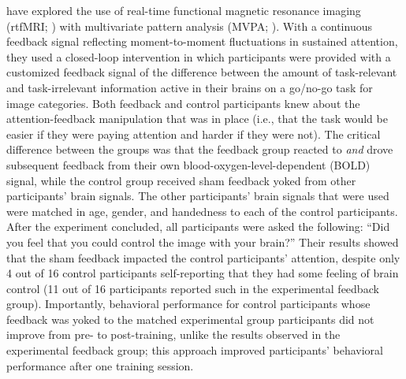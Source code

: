 \textcite{debettencourt2015closed} have explored the use of real-time functional magnetic resonance imaging (rtfMRI; \cite{weiskopf2004principles,laconte2011decoding,sulzer2013real}) with multivariate pattern analysis (MVPA; \cite{norman2006beyond}). With a continuous feedback signal reflecting moment-to-moment fluctuations in sustained attention, they used a closed-loop intervention in which participants were provided with a customized feedback signal of the difference between the amount of task-relevant and task-irrelevant information active in their brains on a go/no-go task for image categories. Both feedback and control participants knew about the attention-feedback manipulation that was in place (i.e., that the task would be easier if they were paying attention and harder if they were not). The critical difference between the groups was that the feedback group reacted to \emph{and} drove subsequent feedback from their own blood-oxygen-level-dependent (BOLD) signal, while the control group received sham feedback yoked from other participants' brain signals. The other participants' brain signals that were used were matched in age, gender, and handedness to each of the control participants. After the experiment concluded, all participants were asked the following: \enquote{Did you feel that you could control the image with your brain?} Their results showed that the sham feedback impacted the control participants' attention, despite only 4 out of 16 control participants self-reporting that they had some feeling of brain control (11 out of 16 participants reported such in the experimental feedback group). Importantly, behavioral performance for control participants whose feedback was yoked to the matched experimental group participants did not improve from pre- to post-training, unlike the results observed in the experimental feedback group; this approach improved participants' behavioral performance after one training session.

